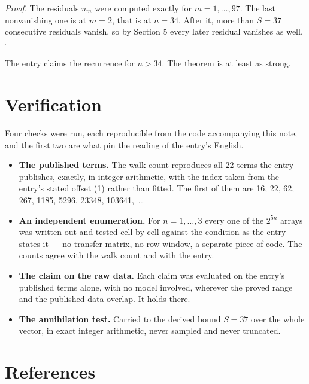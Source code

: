 \documentclass[11pt]{article}
\theoremstyle{definition}
\begin{document}
{\itshape Proof.} The residuals $u_m$ were computed exactly for $m = 1,\dots,97$. The last nonvanishing one is at $m = 2$, that is at $n = 34$. After it, more than $S = 37$ consecutive residuals vanish, so by Section 5 every later residual vanishes as well. $\square$

The entry claims the recurrence for $n > 34$. The theorem is at least as strong.

\section{Verification}

Four checks were run, each reproducible from the code accompanying this note, and the first two are what pin the reading of the entry's English.

\begin{itemize}

\item {\bfseries The published terms.} The walk count reproduces all 22 terms the entry publishes, exactly, in integer arithmetic, with the index taken from the entry's stated offset (1) rather than fitted. The first of them are 16, 22, 62, 267, 1185, 5296, 23348, 103641,~\dots

\item {\bfseries An independent enumeration.} For $n = 1,\dots,3$ every one of the $2^{5n}$ arrays was written out and tested cell by cell against the condition as the entry states it --- no transfer matrix, no row window, a separate piece of code. The counts agree with the walk count and with the entry.

\item {\bfseries The claim on the raw data.} Each claim was evaluated on the entry's published terms alone, with no model involved, wherever the proved range and the published data overlap. It holds there.

\item {\bfseries The annihilation test.} Carried to the derived bound $S = 37$ over the whole vector, in exact integer arithmetic, never sampled and never truncated.

\end{itemize}

\section{References}
\end{document}
